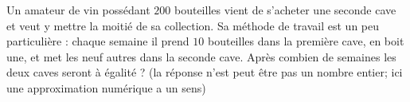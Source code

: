 
\begin{exercice}\label{exosmath-0495}

    Un amateur de vin possédant \( 200\) bouteilles vient de s'acheter une seconde cave et veut y mettre la moitié de sa collection. Sa méthode de travail est un peu particulière : chaque semaine il prend \( 10\) bouteilles dans la première cave, en boit une, et met les neuf autres dans la seconde cave. Après combien de semaines les deux caves seront à égalité ? (la réponse n'est peut être pas un nombre entier; ici une approximation numérique a un sens)

\end{exercice}
